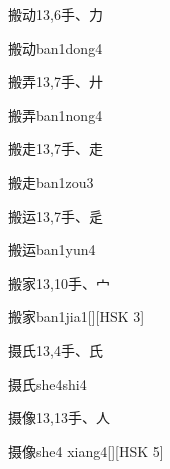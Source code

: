\begin{entry}{搬动}{13,6}{⼿、⼒}
  \begin{phonetics}{搬动}{ban1dong4}
  \end{phonetics}
\end{entry}

\begin{entry}{搬弄}{13,7}{⼿、⼶}
  \begin{phonetics}{搬弄}{ban1nong4}
  \end{phonetics}
\end{entry}

\begin{entry}{搬走}{13,7}{⼿、⾛}
  \begin{phonetics}{搬走}{ban1zou3}
  \end{phonetics}
\end{entry}

\begin{entry}{搬运}{13,7}{⼿、⾡}
  \begin{phonetics}{搬运}{ban1yun4}
  \end{phonetics}
\end{entry}

\begin{entry}{搬家}{13,10}{⼿、⼧}
  \begin{phonetics}{搬家}{ban1jia1}[][HSK 3]
  \end{phonetics}
\end{entry}

\begin{entry}{摄氏}{13,4}{⼿、⽒}
  \begin{phonetics}{摄氏}{she4shi4}
  \end{phonetics}
\end{entry}

\begin{entry}{摄像}{13,13}{⼿、⼈}
  \begin{phonetics}{摄像}{she4 xiang4}[][HSK 5]
  \end{phonetics}
\end{entry}

